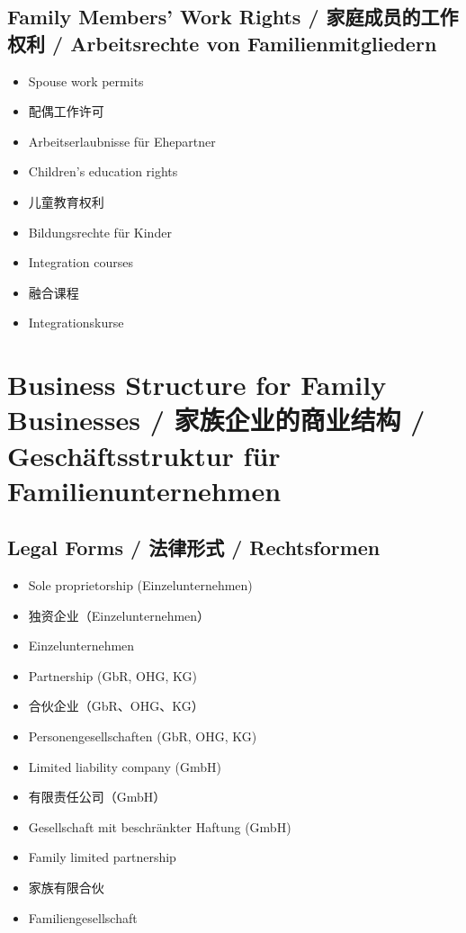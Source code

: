 \subsection{Family Members' Work Rights / 家庭成员的工作权利 / Arbeitsrechte von Familienmitgliedern}
\begin{itemize}
    \item Spouse work permits
    \item 配偶工作许可
    \item Arbeitserlaubnisse für Ehepartner
    \item Children's education rights
    \item 儿童教育权利
    \item Bildungsrechte für Kinder
    \item Integration courses
    \item 融合课程
    \item Integrationskurse
\end{itemize}

\section{Business Structure for Family Businesses / 家族企业的商业结构 / Geschäftsstruktur für Familienunternehmen}

\subsection{Legal Forms / 法律形式 / Rechtsformen}
\begin{itemize}
    \item Sole proprietorship (Einzelunternehmen)
    \item 独资企业（Einzelunternehmen）
    \item Einzelunternehmen
    \item Partnership (GbR, OHG, KG)
    \item 合伙企业（GbR、OHG、KG）
    \item Personengesellschaften (GbR, OHG, KG)
    \item Limited liability company (GmbH)
    \item 有限责任公司（GmbH）
    \item Gesellschaft mit beschränkter Haftung (GmbH)
    \item Family limited partnership
    \item 家族有限合伙
    \item Familiengesellschaft
\end{itemize}


